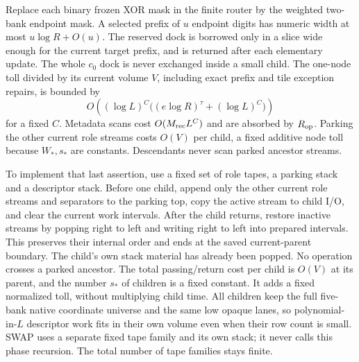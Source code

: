 Replace each binary frozen XOR mask in the finite router by the weighted
two-bank endpoint mask.  A selected prefix of $u$ endpoint digits has
numeric width at most $u\log R+O(u)$.  The reserved dock is borrowed only
in a slice wide enough for the current target prefix, and is returned
after each elementary update.  The whole $c_0$ dock is never exchanged
inside a small child. The one-node toll divided by its current volume
$V$, including exact prefix and tile exception repairs, is bounded by
\[
 O\!\left((\log L)^C\bigl((e\log R)^\tau+(\log L)^C\bigr)\right)
\]
for a fixed $C$.  Metadata scans cost $O(M_{\rm rec}L^C)$ and are absorbed by
$R_{\rm op}$.  Parking the other current role streams costs $O(V)$ per
child, a fixed additive node toll because $W_*,s_*$ are constants.
Descendants never scan parked ancestor streams.

To implement that last assertion, use a fixed set of role tapes, a
parking stack and a descriptor stack. Before one child, append only the
other current role streams and separators to the parking top, copy the
active stream to child I/O, and clear the current work intervals.
After the child returns, restore inactive streams by popping right to
left and writing right to left into prepared intervals. This preserves
their internal order and ends at the saved current-parent boundary.
The child's own stack material has already been popped. No operation
crosses a parked ancestor. The total passing/return cost per child is
$O(V)$ at its parent, and the number $s_*$ of children is a fixed
constant. It adds a fixed normalized toll, without multiplying child
time. All children keep the full five-bank native coordinate universe and the
same low opaque lanes, so polynomial-in-$L$ descriptor work fits in
their own volume even when their row count is small. SWAP uses a
separate fixed tape family and its own stack; it never calls this
phase recursion. The total number of tape families stays finite.

